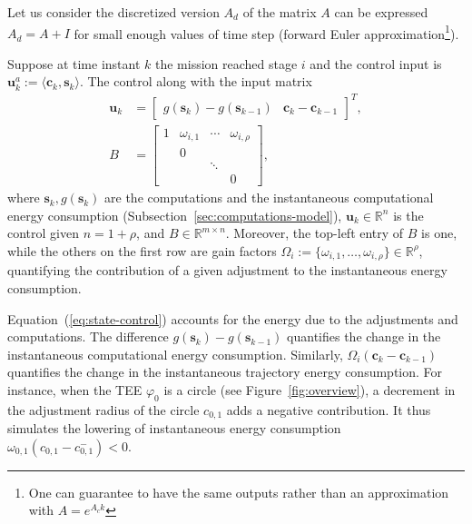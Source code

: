 \documentclass[letterpaper,10pt,conference]{ieeeconf}
\theoremstyle{definition}
\begin{document}
Let us consider the discretized version $A_d$ of the matrix $A$ can be expressed $A_d=A+I$ for small enough values of time step (forward Euler approximation\footnote{One can guarantee to have the same outputs rather than an approximation with $A=e^{A_ck}$}). %

Suppose at time instant $k$ the mission reached stage $i$ and the control input is $\mathbf{u}_k^a:=\langle\mathbf{c}_k,\mathbf{s}_k\rangle$. The control along with the input matrix
\begin{equation}\label{eq:state-control}\begin{split}  
  \mathbf{u}_k&=\begin{bmatrix}g(\mathbf{s}_k)-g(\mathbf{s}_{k-1}) & \mathbf{c}_k-\mathbf{c}_{k-1}\end{bmatrix}^T,\\
  B&=\left[\begin{array}{cccc}
    1& \omega_{i,1}& \cdots& \omega_{i,\rho}  \\
     &            0&       &  \\
     &             & \ddots&  \\
     &             &       & 0
  \end{array}\right],
\end{split}\end{equation}
where $\mathbf{s}_k,g(\mathbf{s}_k)$ are the computations and the instantaneous computational energy consumption (Subsection~\ref{sec:computations-model}), $\mathbf{u}_k\in\mathbb{R}^n$ is the control given $n=1+\rho$, and $B\in\mathbb{R}^{m\times n}$. Moreover, the top-left entry of $B$ is one, while the others on the first row are gain factors $\Omega_{i}:=\{\omega_{i,1},\dots, \omega_{i,\rho}\}\in\mathbb{R}^\rho$, quantifying the contribution of a given adjustment to the instantaneous energy consumption. 

Equation~(\ref{eq:state-control}) accounts for the energy due to the adjustments and computations. The difference $g(\mathbf{s}_k)-g(\mathbf{s}_{k-1})$ quantifies the change in the instantaneous computational energy consumption. Similarly, $\Omega_i(\mathbf{c}_k-\mathbf{c}_{k-1})$ quantifies the change in the instantaneous trajectory energy consumption. For instance, when the TEE $\varphi_0$ is a circle (see Figure~\ref{fig:overview}), a decrement in the adjustment radius of the circle $c_{0,1}$ adds a negative contribution. It thus simulates the lowering of instantaneous energy consumption $\omega_{0,1}(c_{0,1}-c_{0,1}^-)<0$.
\end{document}
